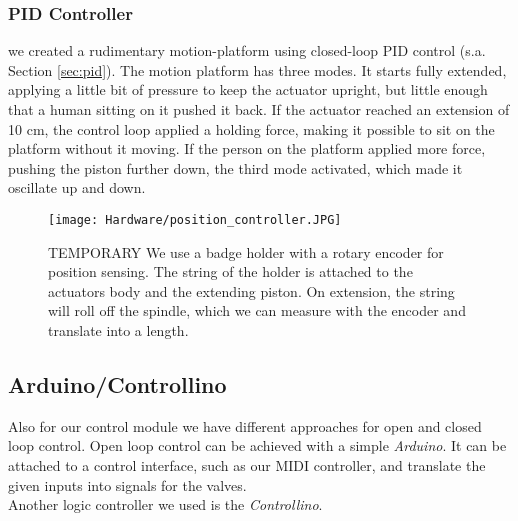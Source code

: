 \subsubsection{PID Controller}
we created a rudimentary motion-platform using closed-loop PID control (s.a. Section \ref{sec:pid}). The motion platform has three modes. It starts fully extended, applying a little bit of pressure to keep the actuator upright, but little enough that a human sitting on it pushed it back. If the actuator reached an extension of 10 cm, the control loop applied a holding force, making it possible to sit on the platform without it moving. If the person on the platform applied more force, pushing the piston further down, the third mode activated, which made it oscillate up and down.

\begin{figure}[h!]
    \texttt{[image: Hardware/position\_controller.JPG]}
    \centering
    \caption{TEMPORARY We use a badge holder with a rotary encoder for position sensing. The string of the holder is attached to the actuators body and the extending piston. On extension, the string will roll off the spindle, which we can measure with the encoder and translate into a length.}
    \label{fig:position_control}
\end{figure}

\subsection{Arduino/Controllino}
Also for our control module we have different approaches for open and closed loop control. Open loop control can be achieved with a simple \textit{Arduino}. It can be attached to a control interface, such as our MIDI controller, and translate the given inputs into signals for the valves.\\
Another logic controller we used is the \textit{Controllino}.
